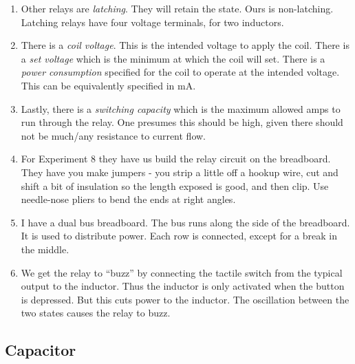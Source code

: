 \documentclass[11pt, oneside]{amsart}
\begin{document}
\begin{enumerate}
  \item Other relays are \emph{latching}. They will retain the state.
  Ours is non-latching. Latching relays have four voltage terminals, for
  two inductors.

  \item There is a \emph{coil voltage}. This is the intended voltage to
  apply the coil. There is a \emph{set voltage} which is the minimum at
  which the coil will set. There is a \emph{power consumption} specified
  for the coil to operate at the intended voltage. This can be
  equivalently specified in mA.

  \item Lastly, there is a \emph{switching capacity} which is the
  maximum allowed amps to run through the relay. One presumes this
  should be high, given there should not be much/any resistance to
  current flow.

  \item For Experiment 8 they have us build the relay circuit on the
  breadboard. They have you make jumpers - you strip a little off a
  hookup wire, cut and shift a bit of insulation so the length exposed
  is good, and then clip. Use needle-nose pliers to bend the ends at
  right angles.

  \item I have a dual bus breadboard. The bus runs along the side of the
  breadboard. It is used to distribute power. Each row is connected,
  except for a break in the middle.

  \item We get the relay to ``buzz'' by connecting the tactile switch
  from the typical output to the inductor. Thus the inductor is only
  activated when the button is depressed. But this cuts power to the
  inductor. The oscillation between the two states causes the relay to
  buzz.
\end{enumerate}

\subsection{Capacitor}
\end{document}
